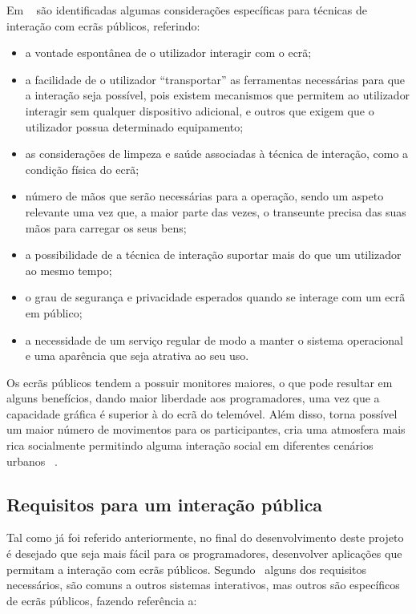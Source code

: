 Em ~\cite{Ballagas} são identificadas algumas considerações específicas para técnicas de interação com ecrãs públicos, referindo: 
	\begin{itemize}
	\item a vontade espontânea de o utilizador interagir com o ecrã;

	\item a facilidade de o utilizador ``transportar'' as ferramentas necessárias para que a interação seja possível, pois existem mecanismos que permitem ao utilizador interagir sem qualquer dispositivo adicional, e outros que exigem que o utilizador possua determinado equipamento;

	\item as considerações de limpeza e saúde associadas à técnica de interação, como a condição física do ecrã;

	\item número de mãos que serão necessárias para a operação, sendo um aspeto relevante uma vez que, a maior parte das vezes, o transeunte precisa das suas mãos para carregar os seus bens;

	\item a possibilidade de a técnica de interação suportar mais do que um utilizador ao mesmo tempo;

	\item o grau de segurança e privacidade esperados quando se interage com um ecrã em público;

	\item a necessidade de um serviço regular de modo a manter o sistema operacional e uma aparência que seja atrativa ao seu uso.
	\end{itemize}

Os ecrãs públicos tendem a possuir monitores maiores, o que pode resultar em alguns benefícios, dando maior liberdade aos programadores, uma vez que a capacidade gráfica é superior à do ecrã do telemóvel. Além disso, torna possível um maior número de movimentos para os participantes, cria uma atmosfera mais rica socialmente permitindo alguma interação social em diferentes cenários urbanos ~\cite{Vajk2008b}.

\subsection{Requisitos para um interação pública} \label{batik} 

Tal como já foi referido anteriormente, no final do desenvolvimento deste projeto é desejado que seja mais fácil para os programadores, desenvolver aplicações que permitam a interação com ecrãs públicos. Segundo~\cite{Cardoso2012g} alguns dos requisitos necessários, são comuns a outros sistemas interativos, mas outros são específicos de ecrãs públicos, fazendo referência a:

